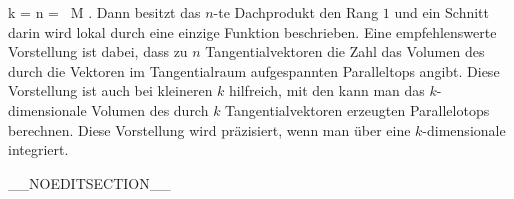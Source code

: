 {\mavergleichskette
{\vergleichskette
{ k
}
{ = }{ n
}
{ = }{  \, M
}
{    }{
}
{   }{
}
}
{}{}{.}
Dann besitzt das $n$-te Dachprodukt den Rang $1$
 {} {}
und ein Schnitt darin wird lokal durch eine einzige Funktion beschrieben. Eine empfehlenswerte Vorstellung ist dabei, dass zu $n$ Tangentialvektoren die Zahl
 das
 {} {}
Volumen des durch die Vektoren im Tangentialraum aufgespannten Paralleltops angibt. Diese Vorstellung ist auch bei kleineren $k$ hilfreich, mit den
 kann man das $k$-dimensionale Volumen des durch $k$ Tangentialvektoren erzeugten Parallelotops berechnen. Diese Vorstellung wird präzisiert, wenn man über eine $k$-dimensionale
integriert.

}

__NOEDITSECTION__


